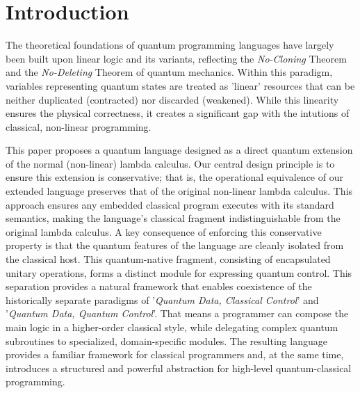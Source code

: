 \section{Introduction} \label{sec:intro}
The theoretical foundations of quantum programming languages have largely been built upon linear logic and its variants\cite{VANTONDER2004_LambdaCalculusQuantum,SELINGER2009_QuantumLambdaCalculus,ALTENKIRCH2005_FunctionalQuantumProgramming,SABRY2018_SymmetricPatternMatchingQuantum,ROSS2017_AlgebraicLogicalMethods}, reflecting the \textit{No-Cloning} Theorem and the \textit{No-Deleting} Theorem of quantum mechanics.
Within this paradigm, variables representing quantum states are treated as 'linear' resources that can be neither duplicated (contracted) nor discarded (weakened).
While this linearity ensures the physical correctness, it creates a significant gap with the intutions of classical, non-linear programming.

This paper proposes a quantum language designed as a direct quantum extension of the normal (non-linear) lambda calculus.
Our central design principle is to ensure this extension is conservative; that is, the operational equivalence of our extended language preserves that of the original non-linear lambda calculus.
This approach ensures any embedded classical program executes with its standard semantics, making the language's classical fragment indistinguishable from the original lambda calculus.
A key consequence of enforcing this conservative property is that the quantum features of the language are cleanly isolated from the classical host.
This quantum-native fragment, consisting of encapsulated unitary operations, forms a distinct module for expressing quantum control.
This separation provides a natural framework that enables coexistence of the historically separate paradigms of '\textit{Quantum Data, Classical Control}' and '\textit{Quantum Data, Quantum Control}'.
That means a programmer can compose the main logic in a higher-order classical style, while delegating complex quantum subroutines to specialized, domain-specific modules.
The resulting language provides a familiar framework for classical programmers and, at the same time, introduces a structured and powerful abstraction for high-level quantum-classical programming.
